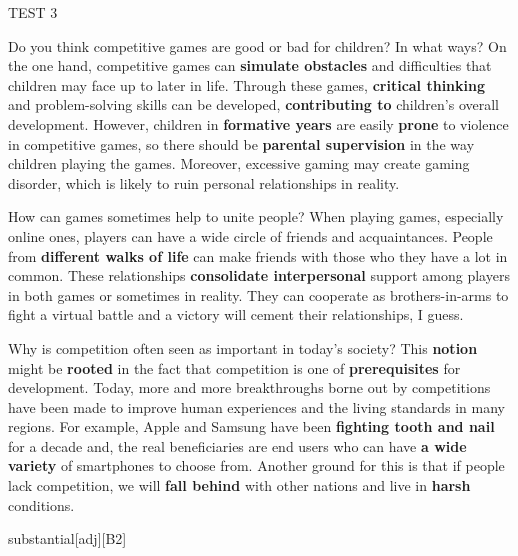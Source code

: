 \begin{glossarymc}[Cambridge 6]
\begin{test}{TEST 3}
    \begin{qa}{Do you think competitive games are good or bad for children? In what ways?}
    On the one hand, competitive games can \textbf{simulate obstacles} and difficulties that children may face up to later in life. Through these games, \textbf{critical thinking} and problem-solving skills can be developed, \textbf{contributing to} children's overall development. However, children in \textbf{formative years} are easily \textbf{prone} to violence in competitive games, so there should be \textbf{parental supervision} in the way children playing the games. Moreover, excessive gaming may create gaming disorder, which is likely to ruin personal relationships in reality.
    \end{qa}

    \begin{qa}{How can games sometimes help to unite people?}
    When playing games, especially online ones, players can have a wide circle of friends and acquaintances. People from \textbf{different walks of life} can make friends with those who they have a lot in common. These relationships \textbf{consolidate interpersonal} support among players in both games or sometimes in reality. They can cooperate as brothers-in-arms to fight a virtual battle and a victory will cement their relationships, I guess.
    \end{qa}

    \begin{qa}{Why is competition often seen as important in today's society?}
    This \textbf{notion} might be \textbf{rooted} in the fact that competition is one of \textbf{prerequisites} for development. Today, more and more breakthroughs borne out by competitions have been made to improve human experiences and the living standards in many regions. For example, Apple and Samsung have been \textbf{fighting tooth and nail} for a decade and, the real beneficiaries are end users who can have \textbf{a wide variety} of smartphones to choose from. Another ground for this is that if people lack competition, we will \textbf{fall behind} with other nations and live in \textbf{harsh} conditions.
    \end{qa}

        \begin{VocabExplain}[Part 3]
            \begin{ExplainCard}{substantial}[adj][B2]
            \end{ExplainCard}


\end{VocabExplain}
\end{test}
\end{glossarymc}
